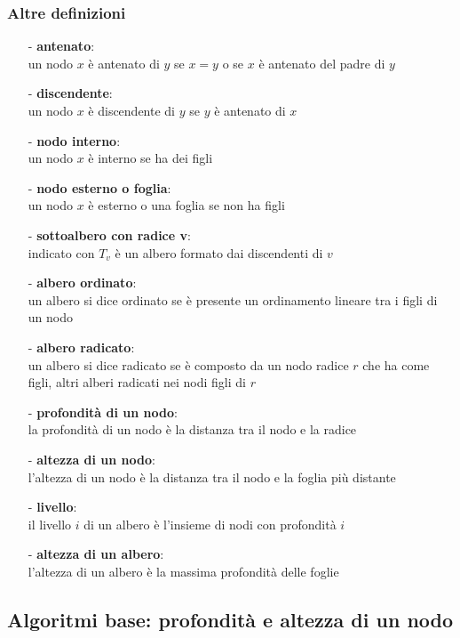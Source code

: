\documentclass[a4paper]{article}
\begin{document}
\subsubsection*{Altre definizioni}
\begin{itemize}[topsep=3pt, itemsep=0pt]
	\item[-] \textbf{antenato}: \\
	un nodo \(x\) è antenato di \(y\) se \(x = y\) o se \(x\) è antenato del padre di \(y\)
	\item[-] \textbf{discendente}: \\
	un nodo \(x\) è discendente di \(y\) se \(y\) è antenato di \(x\)
	\item[-] \textbf{nodo interno}: \\
	un nodo \(x\) è interno se ha dei figli
	\item[-] \textbf{nodo esterno o foglia}: \\
	un nodo \(x\) è esterno o una foglia se non ha figli
	\item[-] \textbf{sottoalbero con radice v}: \\
	indicato con \(T_v\) è un albero formato dai discendenti di \(v\)
	\item[-] \textbf{albero ordinato}: \\
	un albero si dice ordinato se è presente un ordinamento lineare tra i figli di un nodo
	\item[-] \textbf{albero radicato}: \\
	un albero si dice radicato se è composto da un nodo radice \(r\) che ha come figli, altri alberi radicati nei nodi figli di \(r\)
	\item[-] \textbf{profondità di un nodo}: \\
	la profondità di un nodo è la distanza tra il nodo e la radice
	\item[-] \textbf{altezza di un nodo}: \\
	l'altezza di un nodo è la distanza tra il nodo e la foglia più distante
	\item[-] \textbf{livello}: \\
	il livello \(i\) di un albero è l'insieme di nodi con profondità \(i\)
	\item[-] \textbf{altezza di un albero}: \\
	l'altezza di un albero è la massima profondità delle foglie
\end{itemize}

\newpage

\subsection{Algoritmi base: profondità e altezza di un nodo}
\end{document}
